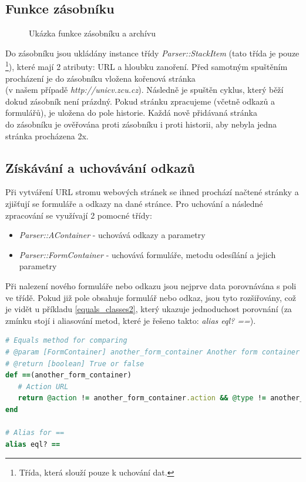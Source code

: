 \documentclass[12pt, a4paper]{report}
\begin{document}
\subsection{Funkce zásobníku}
\begin{figure}[h!]
\caption{Ukázka funkce zásobníku a archívu}
\label{obr.url_tree}
\end{figure}
Do zásobníku jsou ukládány instance třídy \textit{Parser::StackItem} (tato třída je pouze \footnote{Třída, která slouží pouze k uchování dat.}), které mají 2 atributy: URL a hloubku zanoření. Před samotným spuštěním procházení je do zásobníku vložena kořenová stránka \\(v našem případě \textit{http://unicv.zcu.cz}). Následně je spuštěn cyklus, který běží dokud zásobník není prázdný. Pokud stránku zpracujeme (včetně odkazů a formulářů), je uložena do pole historie. Každá nově přidávaná stránka \\do zásobníku je ověřována proti zásobníku i proti historii, aby nebyla jedna stránka procházena 2x.

\subsection{Získávání a uchovávání odkazů}
Při vytváření URL stromu webových stránek se ihned prochází načtené stránky a zjišťují se formuláře a odkazy na dané stránce. Pro uchování a následné zpracování se využívají 2 pomocné třídy:
\begin{itemize}
\item \textit{Parser::AContainer} - uchovává odkazy a parametry
\item \textit{Parser::FormContainer} - uchovává formuláře, metodu odesílání a jejich parametry
\end{itemize}
Při nalezení nového formuláře nebo odkazu jsou nejprve data porovnávána s poli ve třídě. Pokud již pole obsahuje formulář nebo odkaz, jsou tyto rozšiřovány, což je vidět u příkladu \ref{equals_classes2}, který ukazuje jednoduchost porovnání (za zmínku stojí i aliasování metod, které je řešeno takto: \textit{alias eql? ==}).

\begin{lstlisting}[label=equals_classes2,language=Ruby, caption=Porovnání dvou instancí třídy FormContainer]
# Equals method for comparing
# @param [FormContainer] another_form_container Another form container
# @return [boolean] True or false
def ==(another_form_container)
   # Action URL
   return @action != another_form_container.action && @type != another_form_container.type &&  @params != another_form_container.params
end

# Alias for ==
alias eql? ==
\end{lstlisting}
\end{document}
